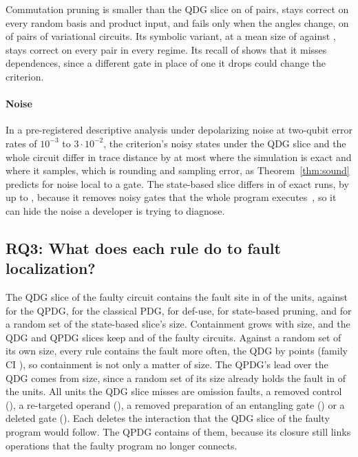 Commutation pruning is smaller than the QDG slice on \numLcqSmallerThanLc{} of \numLcqApplicable{} pairs,
stays correct on every random basis and product input, and fails only when the angles change, on
\numRobLcqParamFail{} of \numRobLcqParamN{} pairs of variational circuits. Its symbolic variant, at a mean
size of \numLcqsSize{} against \numLcqSize{}, stays correct on every pair in every regime. Its recall of
\numLcqRecall{} shows that it misses dependences, since a different gate in place of one it drops could
change the criterion.

\paragraph*{Noise}
In a pre-registered descriptive analysis under depolarizing noise at two-qubit error rates of $10^{-3}$ to
$3\cdot10^{-2}$, the criterion's noisy states under the QDG slice and the whole circuit differ in trace
distance by at most \numNoiseLcCrossExactMax{} where the simulation is exact and \numNoiseLcCrossShotMax{}
where it samples, which is rounding and sampling error, as Theorem~\ref{thm:sound} predicts for noise local
to a gate. The state-based slice differs in \numNoiseQCrossExactNonzero{} of \numNoiseQCrossExactN{} exact
runs, by up to \numNoiseQCrossExactMax{}, because it removes noisy gates that the whole program
executes~\cite{preskill2018nisq}, so it can hide the noise a developer is trying to diagnose.

\subsection{RQ3: What does each rule do to fault localization?}

The QDG slice of the faulty circuit contains the fault site in \numRqThreeContainLc{} of the
\numRqThreeUnits{} units, against \numRqThreeContainYz{} for the QPDG, \numRqThreeContainCpdg{} for the
classical PDG, \numRqThreeContainDu{} for def-use, \numRqThreeContainQ{} for state-based pruning, and
\numRqThreeContainRandom{} for a random set of the state-based slice's size. Containment grows with size, and
the QDG and QPDG slices keep \numRqThreeSizeLc{} and \numRqThreeSizeYz{} of the faulty circuits. Against
a random set of its own size, every rule contains the fault more often, the QDG by \numSizeCtlLcGain{} points
(family CI \numSizeCtlLcGainCi{}), so containment is not only a matter of size. The QPDG's lead over the QDG
comes from size, since a random set of its size already holds the fault in \numSizeCtlYzRandom{} of the units. All
\numLcMissTotal{} units the QDG slice misses are omission faults, a removed control (\numLcMissCrm{}), a
re-targeted operand (\numLcMissQsw{}), a removed preparation of an entangling gate (\numLcMissEnt{}) or a
deleted gate (\numLcMissDel{}). Each deletes the interaction that the QDG slice of the faulty program would
follow. The QPDG contains
\numLcMissYzContained{} of them, because its closure still links operations that the faulty program no
longer connects.

